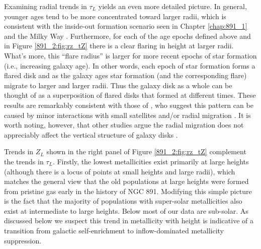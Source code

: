 Examining radial trends in $\tau_L$ yields an even more detailed
picture. In general, younger ages tend to be more concentrated toward
larger radii, which is consistent with the inside-out formation
scenario seen in Chapter \ref{chap:891_1} and the Milky Way
\citep{Bovy12,Hayden15}. Furthermore, for each of the age epochs
defined above and in Figure \ref{891_2:fig:rz_tZ} there is a clear
flaring in height at larger radii. What's more, this ``flare radius''
is larger for more recent epochs of star formation (i.e., increasing
galaxy age). In other words, each epoch of star formation forms a
flared disk and as the galaxy ages star formation (and the
corresponding flare) migrate to larger and larger radii. Thus the
galaxy disk as a whole can be thought of as a superposition of flared
disks that formed at different times. These results are remarkably
consistent with those of \citet{Martig14a}, who suggest this pattern can
be caused by minor interactions with small satellites and/or radial
migration \citep{Minchev12}. It is worth noting, however, that other
studies argue the radial migration does not appreciably affect the
vertical structure of galaxy disks \citep{Vera-Ciro14}.

Trends in $Z_L$ shown in the right panel of Figure
\ref{891_2:fig:rz_tZ} complement the trends in $\tau_L$. Firstly, the
lowest metallicities exist primarily at large heights (although there
is a locus of points at small heights and large radii), which matches
the general view that the old populations at large heights were formed
from pristine gas early in the history of NGC 891. Modifying this
simple picture is the fact that the majority of populations with
super-solar metallicities also exist at intermediate to large
heights. Below  most of our data are sub-solar. As
discussed below we suspect this trend in metallicity with height is
indicative of a transition from galactic self-enrichment to
inflow-dominated metallicity suppression.

